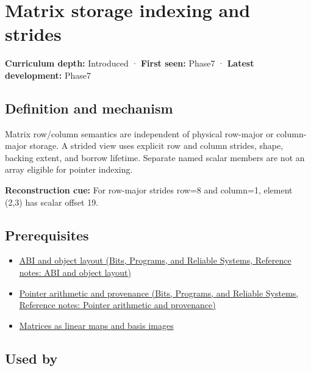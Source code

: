 \hypertarget{appendix-ffdc1d4e5350}{}\label{referencestart:appendix-ffdc1d4e5350}
\section{Matrix storage indexing and strides}\label{appendix-ffdc1d4e5350-matrix-storage-indexing-and-strides}

\textbf{Curriculum depth:} Introduced · \textbf{First seen:} Phase7 · \textbf{Latest development:} Phase7

\subsection{Definition and mechanism}\label{appendix-ffdc1d4e5350-definition-and-mechanism}

Matrix row/column semantics are independent of physical row-major or column-major storage. A strided view uses explicit row and column strides, shape, backing extent, and borrow lifetime. Separate named scalar members are not an array eligible for pointer indexing.

\textbf{Reconstruction cue:} For row-major strides row=8 and column=1, element (2,3) has scalar offset 19.

\subsection{Prerequisites}\label{appendix-ffdc1d4e5350-prerequisites}

\begin{itemize}
\tightlist
\item
  \href{../01-Bits-Programs-and-Reliable-Systems/main.pdf\#nameddest=appendix-c4ac6bb0fff8}{ABI and object layout (Bits, Programs, and Reliable Systems, Reference notes: ABI and object layout)}
\item
  \href{../01-Bits-Programs-and-Reliable-Systems/main.pdf\#nameddest=appendix-6af5921bc853}{Pointer arithmetic and provenance (Bits, Programs, and Reliable Systems, Reference notes: Pointer arithmetic and provenance)}
\item
  \hyperref[appendix-bd39c3bf5d64]{Matrices as linear maps and basis images}
\end{itemize}

\subsection{Used by}\label{appendix-ffdc1d4e5350-used-by}

